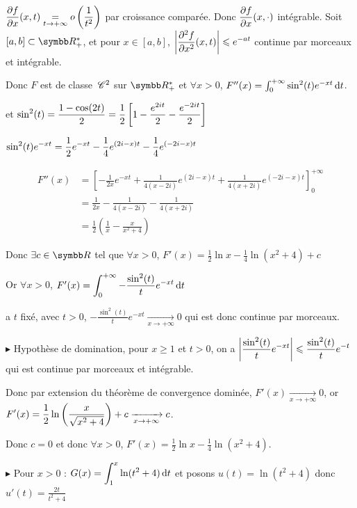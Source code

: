 \begin{exemple}
    $\displaystyle \frac{\partial f}{\partial x} (x, t) \underset{t \to + \infty}{=} o\left( \frac 1 {t^2} \right)$ par croissance comparée.
    Donc $\displaystyle \frac{\partial f}{\partial x} (x, \cdot)$ intégrable. 
    Soit $[a, b] \subset \R_+^*$, et pour $x \in [a, b]$, $\displaystyle \left| \frac{\partial^{2} f}{\partial x^{2}} (x, t) \right| \leqslant e^{-at}$ continue par morceaux et intégrable.

    Donc $F$ est de classe $\,\mathscr C^{2}$ sur $\R_+^*$ et $\forall x > 0$, $F''(x) = \int_0^{+ \infty} \sin^2(t) e^{-xt} \,\mathrm{d}t$.

    et $\displaystyle \sin^2(t) = \frac{1 - \cos (2t)}{2} = \frac 1 2 \left[ 1 - \frac{e^{2it}}{2} - \frac{e^{-2it}}{2} \right]$

    $\displaystyle \sin^2(t) e^{-xt} = \frac 1 2 e^{-xt} - \frac 1 4 e^{(2i - x)t} - \frac 1 4e^{(-2i - x)t}$

    \begin{align}
        F''(x) & = \left[ - \frac 1 {2x} e^{-xt} + \frac 1 {4(x - 2i)} e^{(2i - x)t} + \frac 1 {4(x + 2i)} e^{(-2i - x)t} \right]_0^{+ \infty} \\
        & = \frac{1}{2x} - \frac 1 {4(x - 2i)} - \frac 1 {4(x + 2i)} \\
        & = \frac{1}{2} \left( \frac{1}{x} - \frac{x}{x^2 + 4} \right) 
    \end{align}

    Donc $\exists c \in \R$ tel que $\forall x > 0$, $F'(x) = \frac 1 2 \ln x - \frac 1 4 \ln(x^2 + 4) + c$ 

    Or $\forall x > 0 $, $F'(x) = \displaystyle \int_{0}^{+ \infty} - \frac{\sin^2(t)}{t} e^{-xt} \,\mathrm{d}t$

    a $t$ fixé, avec $t > 0$, $- \frac{\sin^2(t)}{t} e^{-xt} \xrightarrow[x \to + \infty]{} 0$ qui est donc continue par morceaux. 

    \avspace $\blacktriangleright$ Hypothèse de domination, pour $x \geqslant 1$ et $t > 0$, 
    on a $\displaystyle \left| \frac{\sin^2(t)}{t} e^{-xt} \right| \leqslant \frac{\sin^2(t)}{t} e^{-t}$ qui est continue par morceaux et intégrable.

    Donc par extension du théorème de convergence dominée, $F'(x) \xrightarrow[x \to + \infty]{} 0$, 
    or $\displaystyle F'(x) = \frac 1 2 \ln \left( \frac x {\sqrt{x^2 + 4}} \right) + c \xrightarrow[x \to + \infty]{} c$.

    Donc $c = 0$ et donc $\forall x > 0$, $F'(x) = \frac 1 2 \ln x - \frac 1 4 \ln(x^2 + 4)$. 

    \avspace $\blacktriangleright$ Pour $x > 0$ : $G(x) = \displaystyle \int_{1}^{x} \ln(t^2 + 4) \,\mathrm{d}t $ et posons 
    $u(t) = \ln(t^2 + 4)$ donc $u'(t) = \frac{2t}{t^2 + 4} $


\end{exemple}
